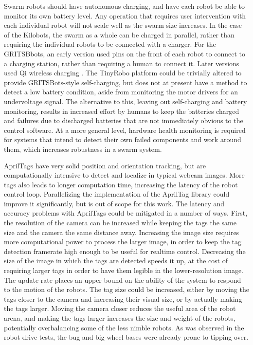 Swarm robots should have autonomous charging, and have each robot be able to monitor its own battery level. 
Any operation that requires user intervention with each individual robot will not scale well as the swarm size increases. 
In the case of the Kilobots, the swarm as a whole can be charged in parallel, rather than requiring the individual robots to be connected with a charger. 
For the GRITSBbots, an early version used  pins on the front of each robot to connect to a charging station, rather than requiring a human to connect it. 
Later versions used Qi wireless charging \citep{pickem2017robotarium}.
The TinyRobo platform could be trivially altered to provide GRITSBots-style self-charging, but does not at present have a method to detect a low battery condition, aside from monitoring the motor drivers for an undervoltage signal. 
The alternative to this, leaving out self-charging and battery monitoring, results in increased effort by humans to keep the batteries charged and failures due to discharged batteries that are not immediately obvious to the control software. 
At a more general level, hardware health monitoring is required for systems that intend to detect their own failed components and work around them, which increases robustness in a swarm system. 

AprilTags have very solid position and orientation tracking, but are computationally intensive to detect and localize in typical webcam images. 
More tags also leads to longer computation time, increasing the latency of the robot control loop. 
Parallelizing the implementation of the AprilTag library could improve it significantly, but is out of scope for this work. 
The latency and accuracy problems with AprilTags could be mitigated in a number of ways. 
First, the resolution of the camera can be increased while keeping the tags the same size and the camera the same distance away. Increasing the image size requires more computational power to process the larger image, in order to keep the tag detection framerate high enough to be useful for realtime control. 
Decreasing the size of the image in which the tags are detected speeds it up, at the cost of requiring larger tags in order to have them legible in the lower-resolution image. 
The update rate places an upper bound on the ability of the system to respond to the motion of the robots.
The tag size could be increased, either by moving the tags closer to the camera and increasing their visual size, or by actually making the tags larger. 
Moving the camera closer reduces the useful area of the robot arena, and making the tags larger increases the size and weight of the robots, potentially overbalancing some of the less nimble robots. 
As was observed in the robot drive tests, the bug and big wheel bases were already prone to tipping over. 

